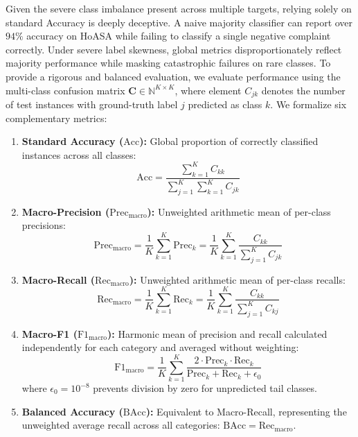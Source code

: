 \documentclass{ieeeaccess}
\begin{document}
Given the severe class imbalance present across multiple targets, relying solely on standard Accuracy is deeply deceptive. A naive majority classifier can report over $94\%$ accuracy on HoASA while failing to classify a single negative complaint correctly. Under severe label skewness, global metrics disproportionately reflect majority performance while masking catastrophic failures on rare classes. To provide a rigorous and balanced evaluation, we evaluate performance using the multi-class confusion matrix $\mathbf{C} \in \mathbb{N}^{K \times K}$, where element $C_{jk}$ denotes the number of test instances with ground-truth label $j$ predicted as class $k$. We formalize six complementary metrics:
\begin{enumerate}
    \item \textbf{Standard Accuracy ($\text{Acc}$):} Global proportion of correctly classified instances across all classes:
    \begin{equation}
        \text{Acc} = \frac{\sum_{k=1}^K C_{kk}}{\sum_{j=1}^K \sum_{k=1}^K C_{jk}}
    \end{equation}
    \item \textbf{Macro-Precision ($\text{Prec}_{\text{macro}}$):} Unweighted arithmetic mean of per-class precisions:
    \begin{equation}
        \text{Prec}_{\text{macro}} = \frac{1}{K} \sum_{k=1}^K \text{Prec}_k = \frac{1}{K} \sum_{k=1}^K \frac{C_{kk}}{\sum_{j=1}^K C_{jk}}
    \end{equation}
    \item \textbf{Macro-Recall ($\text{Rec}_{\text{macro}}$):} Unweighted arithmetic mean of per-class recalls:
    \begin{equation}
        \text{Rec}_{\text{macro}} = \frac{1}{K} \sum_{k=1}^K \text{Rec}_k = \frac{1}{K} \sum_{k=1}^K \frac{C_{kk}}{\sum_{j=1}^K C_{kj}}
    \end{equation}
    \item \textbf{Macro-F1 ($\text{F1}_{\text{macro}}$):} Harmonic mean of precision and recall calculated independently for each category and averaged without weighting:
    \begin{equation}
        \text{F1}_{\text{macro}} = \frac{1}{K} \sum_{k=1}^K \frac{2 \cdot \text{Prec}_k \cdot \text{Rec}_k}{\text{Prec}_k + \text{Rec}_k + \epsilon_0}
    \end{equation}
    where $\epsilon_0 = 10^{-8}$ prevents division by zero for unpredicted tail classes.
    \item \textbf{Balanced Accuracy ($\text{BAcc}$):} Equivalent to Macro-Recall, representing the unweighted average recall across all categories: $\text{BAcc} = \text{Rec}_{\text{macro}}$.

\end{enumerate}
\end{document}
